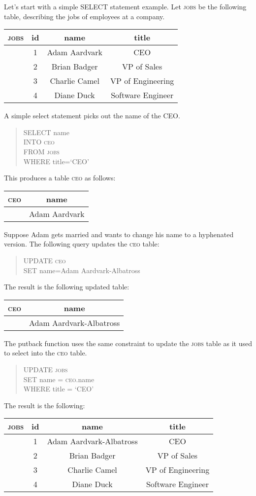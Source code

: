 \documentclass{article}
\begin{document}
Let's start with a simple SELECT statement example.
Let \textsc{jobs} be the following table, describing the jobs of employees
at a company.
\begin{center} \begin{tabular} {c | c c c}
    \textsc{jobs} & id & name & title \\
    \hline
    & 1 & Adam Aardvark & CEO \\
    & 2 & Brian Badger & VP of Sales \\
    & 3 & Charlie Camel & VP of Engineering \\
    & 4 & Diane Duck & Software Engineer
\end{tabular} \end{center}
A simple select statement picks out the name of the CEO.
\begin{quote}
    SELECT name \\
    INTO \textsc{ceo} \\
    FROM \textsc{jobs} \\
    WHERE title=`CEO'
\end{quote}
This produces a table \textsc{ceo} as follows:
\begin{center} \begin{tabular} {c | c}
    \textsc{ceo} & name\\
    \hline
    & Adam Aardvark
\end{tabular} \end{center}
Suppose Adam gets married and wants to change his name to a
hyphenated version. The following query updates the \textsc{ceo} table:
\begin{quote}
    UPDATE \textsc{ceo} \\
    SET name=Adam Aardvark-Albatross
\end{quote}
The result is the following updated table:
\begin{center} \begin{tabular} {c | c}
    \textsc{ceo} & name\\
    \hline
    & Adam Aardvark-Albatross
\end{tabular} \end{center}
The putback function uses the same constraint to update the \textsc{jobs}
table as it used to select into the \textsc{ceo} table. 
\begin{quote}
    UPDATE \textsc{jobs} \\
    SET name = \textsc{ceo}.name \\
    WHERE title = `CEO' 
\end{quote}
The result is the following:
\begin{center} \begin{tabular} {c | c c c}
    \textsc{jobs} & id & name & title \\
    \hline
    & 1 & Adam Aardvark-Albatross & CEO \\
    & 2 & Brian Badger & VP of Sales \\
    & 3 & Charlie Camel & VP of Engineering \\
    & 4 & Diane Duck & Software Engineer
\end{tabular} \end{center}
\end{document}
